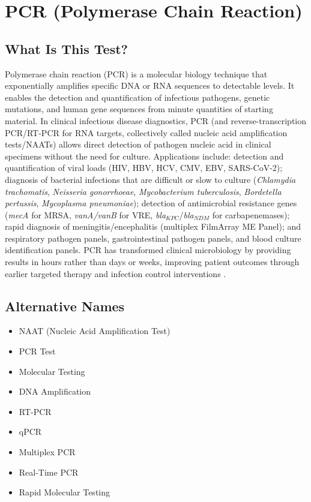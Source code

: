 \chapter{PCR (Polymerase Chain Reaction)}

\section*{What Is This Test?}
Polymerase chain reaction (PCR) is a molecular biology technique that exponentially amplifies specific DNA or RNA sequences to detectable levels. It enables the detection and quantification of infectious pathogens, genetic mutations, and human gene sequences from minute quantities of starting material. In clinical infectious disease diagnostics, PCR (and reverse-transcription PCR/RT-PCR for RNA targets, collectively called nucleic acid amplification tests/NAATs) allows direct detection of pathogen nucleic acid in clinical specimens without the need for culture. Applications include: detection and quantification of viral loads (HIV, HBV, HCV, CMV, EBV, SARS-CoV-2); diagnosis of bacterial infections that are difficult or slow to culture (\textit{Chlamydia trachomatis}, \textit{Neisseria gonorrhoeae}, \textit{Mycobacterium tuberculosis}, \textit{Bordetella pertussis}, \textit{Mycoplasma pneumoniae}); detection of antimicrobial resistance genes (\textit{mecA} for MRSA, \textit{vanA/vanB} for VRE, \textit{bla}$_{KPC}$/\textit{bla}$_{NDM}$ for carbapenemases); rapid diagnosis of meningitis/encephalitis (multiplex FilmArray ME Panel); and respiratory pathogen panels, gastrointestinal pathogen panels, and blood culture identification panels. PCR has transformed clinical microbiology by providing results in hours rather than days or weeks, improving patient outcomes through earlier targeted therapy and infection control interventions \cite{yang2004pcrbased}.

\section*{Alternative Names}
\begin{itemize}
  \item NAAT (Nucleic Acid Amplification Test)
  \item PCR Test
  \item Molecular Testing
  \item DNA Amplification
  \item RT-PCR
  \item qPCR
  \item Multiplex PCR
  \item Real-Time PCR
  \item Rapid Molecular Testing
\end{itemize}
